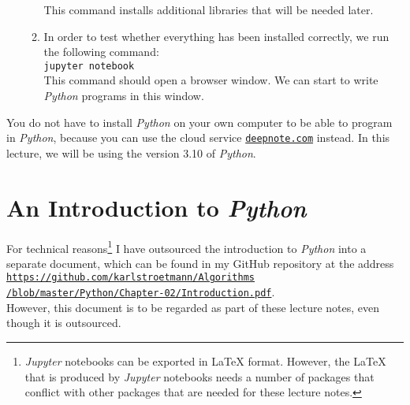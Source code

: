 \begin{enumerate}[(a)]
\begin{enumerate}
            This command installs additional libraries that will be needed later.
      \item In order to test whether everything has been installed correctly, we run the following command:
            \\[0.2cm]
            \hspace*{1.3cm}
            \texttt{jupyter notebook}
            \\[0.2cm]
            This command should open a browser window.  We can start to write \textsl{Python} programs in this window.
      \end{enumerate}
\end{enumerate}
You do not have to install \textsl{Python} on your own computer to be able to program in \textsl{Python},
because you can use the cloud service \href{https://deepnote.com}{\texttt{deepnote.com}} instead.  
In this lecture, we will be using the version 3.10 of \textsl{Python}.

\section{An Introduction to \textsl{Python}}
For technical reasons\footnote{\textsl{Jupyter} notebooks can be exported in {\LaTeX} format.  However, the 
{\LaTeX} that is produced by \textsl{Jupyter} notebooks needs a number of packages that conflict with other
packages that are needed for these lecture notes.}
I have outsourced the introduction to \textsl{Python} into a separate document, which can be found in my GitHub
repository at the address
\\[0.2cm]
\hspace*{1.3cm}
\href{https://github.com/karlstroetmann/Algorithms/blob/master/Python/Chapter-02/Introduction.pdf}{\texttt{https://github.com/karlstroetmann/Algorithms\\
\hspace*{2.3cm}    
    /blob/master/Python/Chapter-02/Introduction.pdf}}.
\\[0.2cm]
However, this document is to be regarded as part of these lecture notes, even though it is outsourced.
\pagebreak

